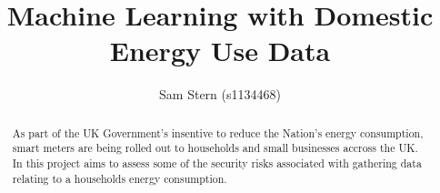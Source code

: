 \documentclass[12pt,a4paper]{report}
\author{Sam Stern (s1134468)}
\title{Machine Learning with Domestic Energy Use Data}
\begin{document}
\maketitle

\begin{abstract}
As part of the UK Government's insentive to reduce the Nation's energy consumption, smart meters are being rolled out to households and small businesses accross the UK. In this project aims to assess some of the security risks associated with gathering data relating to a households energy consumption.
\end{abstract}

\tableofcontents








\end{document}
